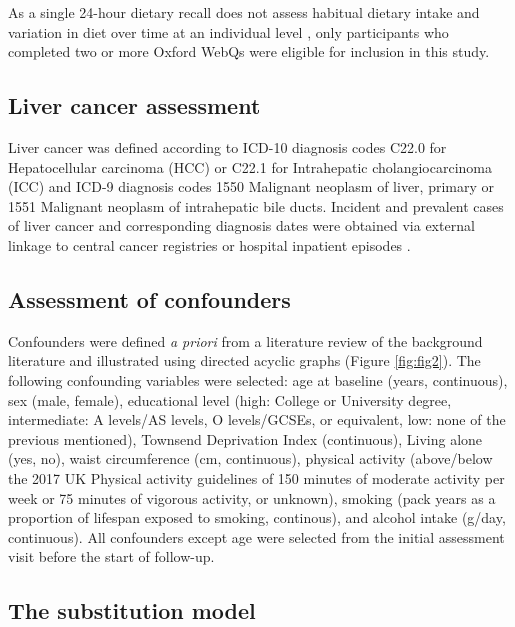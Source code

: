 \documentclass[sn-basic,Numbered,iicol,pdflatex]{sn-jnl}
\begin{document}
As a single 24-hour dietary recall does not assess habitual dietary
intake and variation in diet over time at an individual level
\citep{thompson2013, gurinovic2017}, only participants who completed two or
more Oxford WebQs were eligible for inclusion in this study.

\hypertarget{subsec3}{%
\subsection{Liver cancer assessment}\label{subsec3}}

Liver cancer was defined according to ICD-10 diagnosis codes C22.0 for
Hepatocellular carcinoma (HCC) or C22.1 for Intrahepatic
cholangiocarcinoma (ICC) and ICD-9 diagnosis codes 1550 Malignant
neoplasm of liver, primary or 1551 Malignant neoplasm of intrahepatic
bile ducts. Incident and prevalent cases of liver cancer and
corresponding diagnosis dates were obtained via external linkage to
central cancer registries or hospital inpatient episodes \citep{RN112, RN114}.

\hypertarget{subsec4}{%
\subsection{Assessment of confounders}\label{subsec4}}

Confounders were defined \emph{a priori} from a literature review of the
background literature and illustrated using directed acyclic graphs
(Figure \ref{fig:fig2}). The following confounding variables were
selected: age at baseline (years, continuous), sex (male, female),
educational level (high: College or University degree, intermediate: A
levels/AS levels, O levels/GCSEs, or equivalent, low: none of the
previous mentioned), Townsend Deprivation Index (continuous), Living
alone (yes, no), waist circumference (cm, continuous), physical activity
(above/below the 2017 UK Physical activity guidelines of 150 minutes of
moderate activity per week or 75 minutes of vigorous activity, or
unknown), smoking (pack years as a proportion of lifespan exposed to
smoking, continous), and alcohol intake (g/day, continuous). All
confounders except age were selected from the initial assessment visit
before the start of follow-up.

\hypertarget{subsec5}{%
\subsection{The substitution model}\label{subsec5}}
\end{document}
